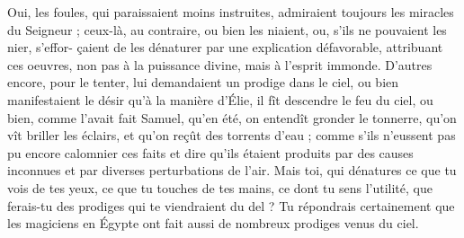 Oui, les foules, qui paraissaient moins instruites, admiraient toujours les miracles du Seigneur ; ceux-là, au contraire, ou bien les niaient, ou, s’ils ne pouvaient les nier, s’effor- çaient de les dénaturer par une explication défavorable, attribuant ces oeuvres, non pas à la puissance divine, mais à l’esprit immonde. D’autres encore, pour le tenter, lui demandaient un prodige dans le ciel, ou bien manifestaient le désir qu’à la manière d’Élie, il fît descendre le feu du ciel, ou bien, comme l’avait fait Samuel, qu’en été, on entendît gronder le tonnerre, qu’on vît briller les éclairs, et qu’on reçût des torrents d’eau ; comme s’ils n’eussent pas pu encore calomnier ces faits et dire qu’ils étaient produits par des causes inconnues et par diverses perturbations de l’air. Mais toi, qui dénatures ce que tu vois de tes yeux, ce que tu touches de tes mains, ce dont tu sens l’utilité, que ferais-tu des prodiges qui te viendraient du del ? Tu répondrais certainement que les magiciens en Égypte ont fait aussi de nombreux prodiges venus du ciel.
